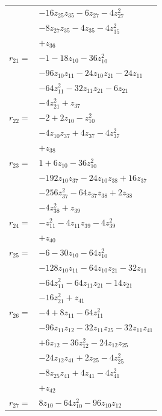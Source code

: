\begin{longtable}{@{}r@{\;}l@{}}
 & \(\displaystyle -16z_{25}z_{35} -6z_{27} -4z_{27}^{2}\) \\
 & \(\displaystyle -8z_{27}z_{35} -4z_{35} -4z_{35}^{2}\) \\
 & \(\displaystyle +z_{36}\) \\[3pt]
\(r_{21}=\) & \(\displaystyle -1 -18z_{10} -36z_{10}^{2}\) \\
 & \(\displaystyle -96z_{10}z_{11} -24z_{10}z_{21} -24z_{11}\) \\
 & \(\displaystyle -64z_{11}^{2} -32z_{11}z_{21} -6z_{21}\) \\
 & \(\displaystyle -4z_{21}^{2} +z_{37}\) \\[3pt]
\(r_{22}=\) & \(\displaystyle -2 +2z_{10} -z_{10}^{2}\) \\
 & \(\displaystyle -4z_{10}z_{37} +4z_{37} -4z_{37}^{2}\) \\
 & \(\displaystyle +z_{38}\) \\[3pt]
\(r_{23}=\) & \(\displaystyle 1 +6z_{10} -36z_{10}^{2}\) \\
 & \(\displaystyle -192z_{10}z_{37} -24z_{10}z_{38} +16z_{37}\) \\
 & \(\displaystyle -256z_{37}^{2} -64z_{37}z_{38} +2z_{38}\) \\
 & \(\displaystyle -4z_{38}^{2} +z_{39}\) \\[3pt]
\(r_{24}=\) & \(\displaystyle -z_{11}^{2} -4z_{11}z_{39} -4z_{39}^{2}\) \\
 & \(\displaystyle +z_{40}\) \\[3pt]
\(r_{25}=\) & \(\displaystyle -6 -30z_{10} -64z_{10}^{2}\) \\
 & \(\displaystyle -128z_{10}z_{11} -64z_{10}z_{21} -32z_{11}\) \\
 & \(\displaystyle -64z_{11}^{2} -64z_{11}z_{21} -14z_{21}\) \\
 & \(\displaystyle -16z_{21}^{2} +z_{41}\) \\[3pt]
\(r_{26}=\) & \(\displaystyle -4 +8z_{11} -64z_{11}^{2}\) \\
 & \(\displaystyle -96z_{11}z_{12} -32z_{11}z_{25} -32z_{11}z_{41}\) \\
 & \(\displaystyle +6z_{12} -36z_{12}^{2} -24z_{12}z_{25}\) \\
 & \(\displaystyle -24z_{12}z_{41} +2z_{25} -4z_{25}^{2}\) \\
 & \(\displaystyle -8z_{25}z_{41} +4z_{41} -4z_{41}^{2}\) \\
 & \(\displaystyle +z_{42}\) \\[3pt]
\(r_{27}=\) & \(\displaystyle 8z_{10} -64z_{10}^{2} -96z_{10}z_{12}\) \\

\end{longtable}
